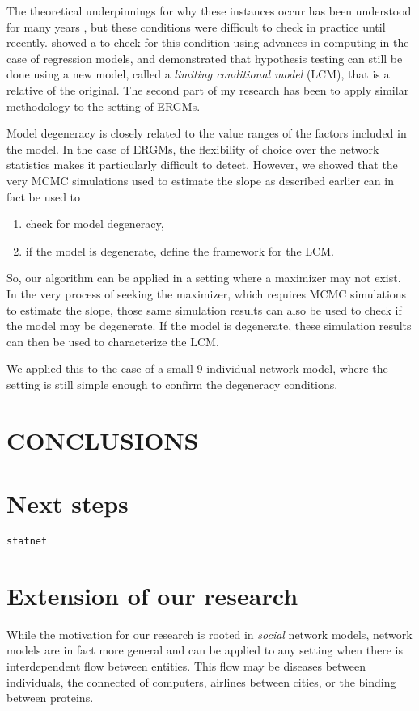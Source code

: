 \documentclass[12pt]{article}
\begin{document}
The theoretical underpinnings for why these instances occur has been 
understood for many years \citep{Barndorff},
but these conditions were difficult to check in practice until recently.  
\citet{Geyer:gdor} showed a to check for this condition using 
advances in computing \citep{Fukuda:2008} in the case
of regression models, and demonstrated that hypothesis testing can still be 
done using a new model, called a \emph{limiting conditional model} (LCM), 
that is a relative of the original.
The second part of my research has been to apply similar methodology to 
the setting of ERGMs.

Model degeneracy is closely related to the value ranges of the factors 
included in the model.  In the case of ERGMs, the flexibility of 
choice over the network statistics makes it particularly difficult
to detect.  However, we showed that the very MCMC simulations used to estimate
the slope as described earlier can in fact be used to 
\begin{enumerate}
\item check for model degeneracy,
\item if the model is degenerate, define the framework for the LCM.
\end{enumerate}
So, our algorithm can be applied in a setting where a maximizer may not exist.  
In the very process of seeking the maximizer, which requires MCMC simulations 
to estimate the slope, those same simulation
results can also be used to check if the model may be degenerate.  If the 
model is degenerate, these simulation results can then be used to characterize the LCM.

We applied this to the case of a small 9-individual network model, 
where the setting is still simple enough to confirm the degeneracy conditions.


\section{CONCLUSIONS}

\section{Next steps}
\texttt{statnet} \citet{statnet:R}
\section{Extension of our research}
While the motivation for our research is rooted in \emph{social} network models, 
network models are in fact more general and can be applied to any setting when there is 
interdependent flow between entities.  This flow may be
diseases between individuals, the connected of computers, airlines between cities, 
or the binding between proteins.  
\end{document}
